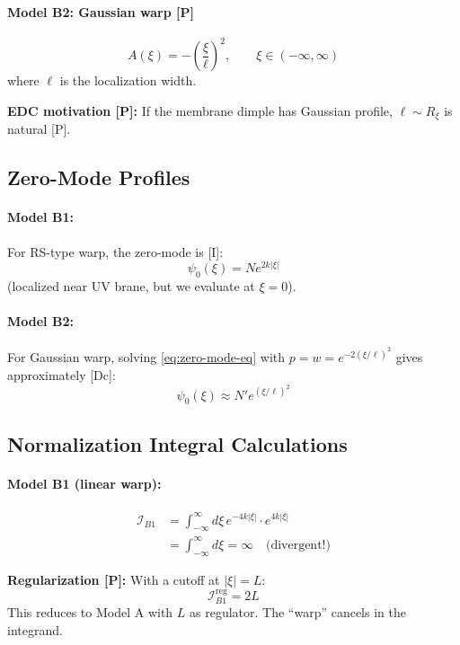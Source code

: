 \documentclass[11pt,a4paper]{article}
\newcommand{\calI}{\mathcal{I}}
\newcommand{\Rxi}{R_\xi}
\begin{document}
\paragraph{Model B2: Gaussian warp [P]}
\begin{equation}
A(\xi) = -\left(\frac{\xi}{\ell}\right)^2, \qquad \xi \in (-\infty, \infty)
\end{equation}
where $\ell$ is the localization width.

\textbf{EDC motivation [P]:} If the membrane dimple has Gaussian profile,
$\ell \sim \Rxi$ is natural [P].

\subsection{Zero-Mode Profiles}

\paragraph{Model B1:} For RS-type warp, the zero-mode is [I]:
\begin{equation}
\psi_0(\xi) = N e^{2k|\xi|}
\end{equation}
(localized near UV brane, but we evaluate at $\xi = 0$).

\paragraph{Model B2:} For Gaussian warp, solving \eqref{eq:zero-mode-eq} with
$p = w = e^{-2(\xi/\ell)^2}$ gives approximately [Dc]:
\begin{equation}
\psi_0(\xi) \approx N' e^{(\xi/\ell)^2}
\end{equation}

\subsection{Normalization Integral Calculations}

\paragraph{Model B1 (linear warp):}
\begin{align}
\calI_{B1} &= \int_{-\infty}^{\infty} d\xi\, e^{-4k|\xi|} \cdot e^{4k|\xi|} \nonumber \\
&= \int_{-\infty}^{\infty} d\xi = \infty \quad \text{(divergent!)}
\end{align}

\textbf{Regularization [P]:} With a cutoff at $|\xi| = L$:
\begin{equation}
\calI_{B1}^{\text{reg}} = 2L
\end{equation}
This reduces to Model A with $L$ as regulator. The ``warp'' cancels in the integrand.
\end{document}
